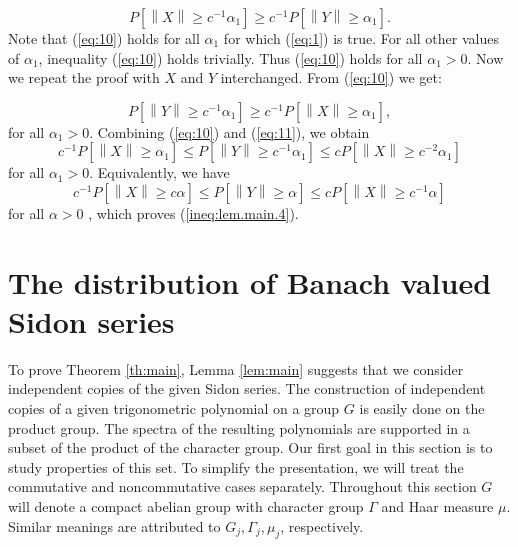 \begin{equation}
P\left[\left\| X\right\| \geq c^{-1}\alpha_1 \right]
                    \geq
c^{-1}P\left[\left\| Y\right\| \geq \alpha_1 \right].
\label{eq:10}
\end{equation}
Note that (\ref{eq:10}) holds for all $\alpha_1$ for which
(\ref{eq:1}) is true.  For all other values of $\alpha_1$, inequality
(\ref{eq:10}) holds trivially.  Thus (\ref{eq:10}) holds for all
$\alpha_1 > 0$.  Now we repeat the proof with $X$ and $Y$ interchanged.
From (\ref{eq:10}) we get:

\begin{equation}
P\left[\left\| Y\right\| \geq c^{-1}\alpha_1 \right]
                    \geq
c^{-1}P\left[\left\| X\right\| \geq \alpha_1 \right],
\label{eq:11}
\end{equation}
%
for all $\alpha_1 >0$.  Combining (\ref{eq:10}) and (\ref{eq:11}), we
obtain
\begin{equation}
c^{-1}P\left[\left\| X\right\| \geq \alpha_1 \right]
                    \leq
P\left[\left\| Y\right\| \geq c^{-1}\alpha_1 \right]
                    \leq
cP\left[\left\| X\right\| \geq c^{-2}\alpha_1 \right]
\label{eq:12}
\end{equation}
%
for all $\alpha_1 > 0$.  Equivalently, we have
\begin{equation}
c^{-1}P\left[\left\| X\right\| \geq c\alpha \right]
                    \leq
P\left[\left\| Y\right\| \geq \alpha \right]
                    \leq
cP\left[\left\| X\right\| \geq c^{-1}\alpha \right]
\label{eq:13}
\end{equation}
%
for all $\alpha > 0$ , which proves (\ref{ineq:lem.main.4}).



\section{The distribution of Banach valued Sidon series}
To prove Theorem \ref{th:main}, Lemma \ref{lem:main} suggests that we
consider independent copies of the given Sidon series.  The
construction of
independent copies of a given trigonometric polynomial on a group $G$ is
easily done on the product group.  The spectra of the resulting
polynomials are supported in a subset of the product of the character
group.  Our first goal in this section is to study properties of this
set.  To simplify the presentation, we will treat the 
commutative and noncommutative cases separately.  Throughout this
section $G$ will denote a compact abelian group with character group
$\Gamma$ and Haar measure $\mu$.  Similar meanings are attributed to
$G_j , \Gamma_j , \mu_j$, respectively.

